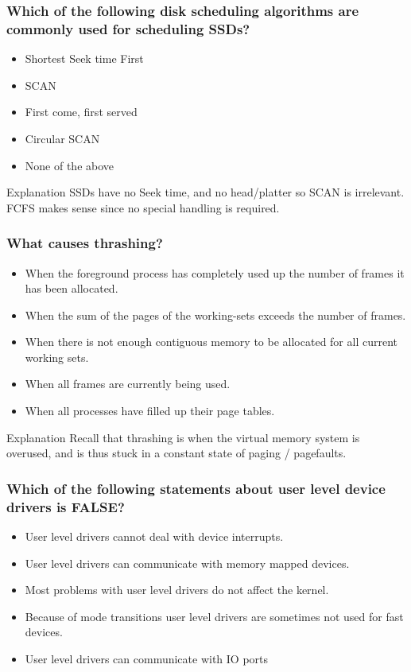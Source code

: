 \documentclass{beamer}
\begin{document}
\begin{frame}
  \frametitle{Which of the following disk scheduling algorithms are commonly used for scheduling SSDs?}
  \begin{itemize}
    \item Shortest Seek time First
    \item SCAN
    \item<alert@2> First come, first served
    \item Circular SCAN
    \item None of the above
  \end{itemize}
  \pause
  \begin{block}{Explanation}
    SSDs have no Seek time, and no head/platter so SCAN is irrelevant. FCFS makes sense since no special handling is required.
  \end{block}
\end{frame}
\begin{frame}
  \frametitle{What causes thrashing?}
  \begin{itemize}
    \item When the foreground process has completely used up the number of frames it has been allocated.
    \item<alert@2> When the sum of the pages of the working-sets exceeds the number of frames.
    \item When there is not enough contiguous memory to be allocated for all current working sets.
    \item When all frames are currently being used.
    \item When all processes have filled up their page tables.
  \end{itemize}
  \pause
  \begin{block}{Explanation}
    Recall that thrashing is when the virtual memory system is overused, and is thus stuck in a constant state of paging / pagefaults.
  \end{block}
\end{frame}
\begin{frame}
  \frametitle{Which of the following statements about user level device drivers is FALSE?}
  \begin{itemize}
    \item<alert@2> User level drivers cannot deal with device interrupts.
    \item User level drivers can communicate with memory mapped devices.
    \item Most problems with user level drivers do not affect the kernel.
    \item Because of mode transitions user level drivers are sometimes not used for fast devices.
    \item User level drivers can communicate with IO ports
  \end{itemize}
\end{frame}
\end{document}
